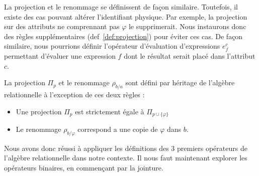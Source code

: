 La projection et le renommage se définissent de façon similaire. Toutefois, il existe des cas pouvant altérer l'identifiant physique. Par exemple, la projection sur des attributs ne comprennant pas $\varphi$ le supprimerait. Nous instaurons donc des règles supplémentaires (def~\ref{def:projection}) pour éviter ces cas. De façon similaire, nous pourrions définir l'opérateur d'évaluation d'expressions $e_f^c$ permettant d'évaluer une expression $f$ dont le résultat serait placé dans l'attribut $c$.
\begin{defi}\label{def:projection}
La projection $\Pi_p$ et le renommage $\rho_{b/a}$ sont défini par héritage de l'algèbre relationnelle à l'exception de ces deux règles :
\begin{itemize}
\item Une projection $\Pi_p$ est strictement égale à $\Pi_{p\cup \{\varphi\}}$
\item Le renommage $\rho_{b/\varphi}$ correspond a une copie de $\varphi$ dans $b$.
\end{itemize}
\end{defi}

Nous avons donc réussi à appliquer les définitions des 3 premiers opérateurs de l'algèbre relationnelle dans notre contexte. Il nous faut maintenant explorer les opérateurs binaires, en commençant par la jointure.

